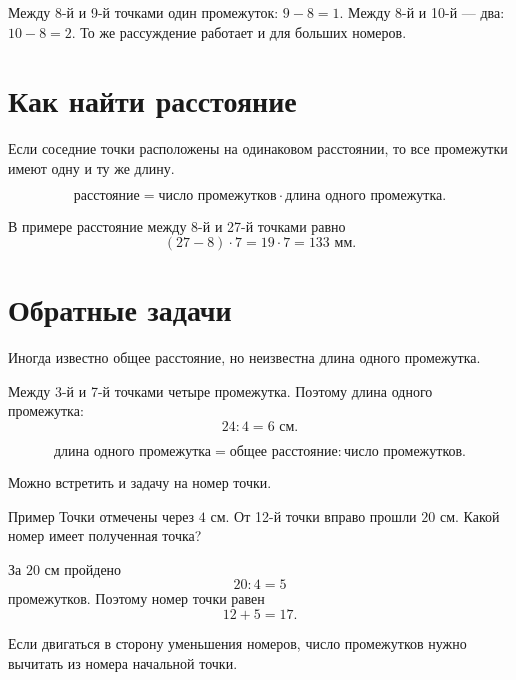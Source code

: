 \begin{notebox}
  Между 8-й и 9-й точками один промежуток: \(9-8=1\). Между 8-й и
  10-й --- два: \(10-8=2\). То же рассуждение работает и для больших
  номеров.
\end{notebox}

\section{Как найти расстояние}

Если соседние точки расположены на одинаковом расстоянии, то все промежутки
имеют одну и ту же длину.

\distanceexamplefigure

\begin{propertybox}
  \[
    \text{расстояние}
      =\text{число промежутков}\cdot
       \text{длина одного промежутка}.
  \]
\end{propertybox}

В примере расстояние между 8-й и 27-й точками равно
\[
  (27-8)\cdot 7=19\cdot 7=133\text{ мм}.
\]

\section{Обратные задачи}

Иногда известно общее расстояние, но неизвестна длина одного промежутка.

\reverseexamplefigure

Между 3-й и 7-й точками четыре промежутка. Поэтому длина одного промежутка:
\[
  24:4=6\text{ см}.
\]

\begin{conclusionbox}
  \[
    \text{длина одного промежутка}
      =\text{общее расстояние}:\text{число промежутков}.
  \]
\end{conclusionbox}

Можно встретить и задачу на номер точки.

\begin{casebox}{Пример}
  Точки отмечены через \(4\) см. От 12-й точки вправо прошли \(20\) см.
  Какой номер имеет полученная точка?

  За \(20\) см пройдено
  \[
    20:4=5
  \]
  промежутков. Поэтому номер точки равен
  \[
    12+5=17.
  \]
\end{casebox}

Если двигаться в сторону уменьшения номеров, число промежутков нужно
вычитать из номера начальной точки.

